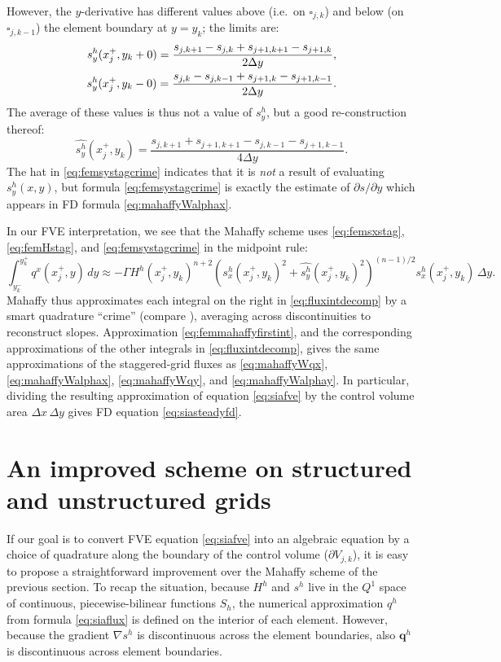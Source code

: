 \documentclass[11pt]{amsart}
\newcommand\bq{\mathbf{q}}
\newcommand{\grad}{\nabla}
\begin{document}
However, the $y$-derivative has different values above (i.e.~on $\square_{j,k}$) and below (on $\square_{j,k-1}$) the element boundary at $y = y_k$; the limits are:
\begin{align}
s^h_y(x_j^+,y_k+0) = \frac{s_{j,k+1}-s_{j,k} + s_{j+1,k+1}-s_{j+1,k}}{2\Delta y}, \\
s^h_y(x_j^+,y_k-0) = \frac{s_{j,k}-s_{j,k-1} + s_{j+1,k}-s_{j+1,k-1}}{2\Delta y}. \notag
\end{align}
The average of these values is thus not a value of $s_y^h$, but a good re-construction thereof:
\begin{equation}
\widehat{s^h_y}(x_j^+,y_k) = \frac{s_{j,k+1} + s_{j+1,k+1} - s_{j,k-1} - s_{j+1,k-1}}{4\Delta y}. \label{eq:femsystagcrime}
\end{equation}
The hat in \eqref{eq:femsystagcrime} indicates that it is \emph{not} a result of evaluating $s^h_y(x,y)$, but formula \eqref{eq:femsystagcrime} is exactly the estimate of $\partial s/\partial y$ which appears in FD formula \eqref{eq:mahaffyWalphax}.

In our FVE interpretation, we see that the Mahaffy scheme uses \eqref{eq:femsxstag}, \eqref{eq:femHstag}, and \eqref{eq:femsystagcrime} in the midpoint rule:
\begin{equation}
\int_{y_k^-}^{y_k^+} q^x(x_j^+,y)\,dy \approx - \Gamma H^h(x_j^+,y_k)^{n+2} \left(s^h_x(x_j^+,y_k)^2 + \widehat{s^h_y}(x_j^+,y_k)^2\right)^{(n-1)/2} s^h_x(x_j^+,y_k)\,\Delta y. \label{eq:femmahaffyfirstint}
\end{equation}
Mahaffy thus approximates each integral on the right in \eqref{eq:fluxintdecomp} by a smart quadrature ``crime'' (compare \cite{Strang1972}), averaging across discontinuities to reconstruct slopes.  Approximation \eqref{eq:femmahaffyfirstint}, and the corresponding approximations of the other integrals in \eqref{eq:fluxintdecomp}, gives the same approximations of the staggered-grid fluxes as \eqref{eq:mahaffyWqx}, \eqref{eq:mahaffyWalphax}, \eqref{eq:mahaffyWqy}, and \eqref{eq:mahaffyWalphay}.  In particular, dividing the resulting approximation of equation \eqref{eq:siafve} by the control volume area $\Delta x\,\Delta y$ gives FD equation \eqref{eq:siasteadyfd}.

\section{An improved scheme on structured and unstructured grids}  \label{sec:star}

If our goal is to convert FVE equation \eqref{eq:siafve} into an algebraic equation by a choice of quadrature along the boundary of the control volume ($\partial V_{j,k}$), it is easy to propose a straightforward improvement over the Mahaffy scheme of the previous section.  To recap the situation, because $H^h$ and $s^h$ live in the $Q^1$ space of continuous, piecewise-bilinear functions $S_h$, the numerical approximation $q^h$ from formula \eqref{eq:siaflux} is defined on the interior of each element.  However, because the gradient $\grad s^h$ is discontinuous across the element boundaries, also $\bq^h$ is discontinuous across element boundaries.
\end{document}
